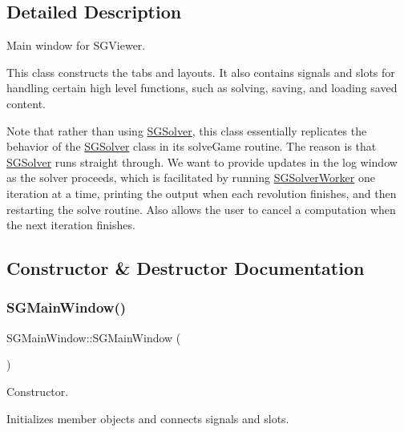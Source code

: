 \subsection{Detailed Description}
Main window for S\+G\+Viewer. 

This class constructs the tabs and layouts. It also contains signals and slots for handling certain high level functions, such as solving, saving, and loading saved content.

Note that rather than using \hyperlink{classSGSolver}{S\+G\+Solver}, this class essentially replicates the behavior of the \hyperlink{classSGSolver}{S\+G\+Solver} class in its solve\+Game routine. The reason is that \hyperlink{classSGSolver}{S\+G\+Solver} runs straight through. We want to provide updates in the log window as the solver proceeds, which is facilitated by running \hyperlink{classSGSolverWorker}{S\+G\+Solver\+Worker} one iteration at a time, printing the output when each revolution finishes, and then restarting the solve routine. Also allows the user to cancel a computation when the next iteration finishes. 

\subsection{Constructor \& Destructor Documentation}
\mbox{\label{classSGMainWindow_af2c1eed12335e81fbbf403557d410d28}} 
\subsubsection{\texorpdfstring{S\+G\+Main\+Window()}{SGMainWindow()}}
{\footnotesize\ttfamily S\+G\+Main\+Window\+::\+S\+G\+Main\+Window (\begin{DoxyParamCaption}{ }\end{DoxyParamCaption})}



Constructor. 

Initializes member objects and connects signals and slots. \mbox{\label{classSGMainWindow_a38e9f6d5431f6b92c898089582b7d124}} 
